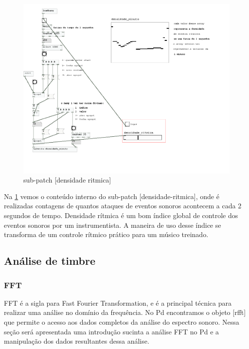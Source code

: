 \documentclass[draft]{ppgmus}
\begin{document}
\begin{figure}
\includegraphics[scale=.75]{prot5c}
\caption{sub-patch [densidade ritmica]}
\label{prot5c}
\end{figure}


Na \ref{prot5c} vemos o conteúdo interno do sub-patch [densidade-ritmica], onde é realizadas
contagens de quantos ataques de eventos sonoros acontecem a cada 2 segundos de tempo.
Densidade rítmica é um bom índice global de controle dos eventos sonoros por um instrumentista.
A maneira de uso desse índice se transforma de um controle rítmico prático para um
músico treinado.





\subsection{Análise de timbre}

\subsubsection{FFT}

FFT é a sigla para Fast Fourier Transformation, e é a principal técnica para realizar uma análise no domínio 
da frequência. No Pd encontramos o objeto [rfft\texttildelow] que permite o 
acesso aos dados completos da análise do espectro sonoro.
Nessa seção será apresentada uma introdução sucinta a 
análise FFT no Pd e a manipulação dos dados resultantes dessa análise.
\end{document}

